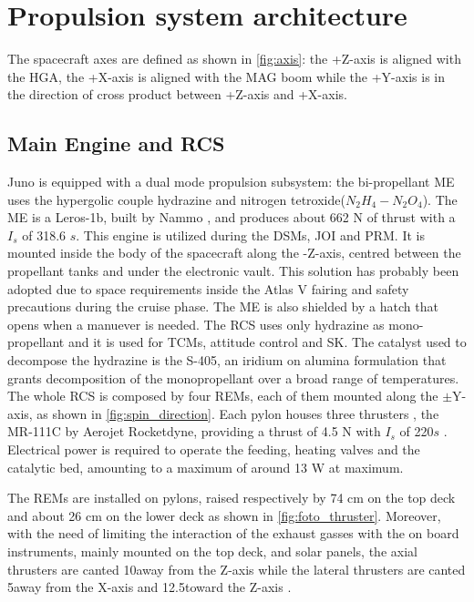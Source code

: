 \section{Propulsion system architecture}
\label{sec:prop_architecture}


The spacecraft axes are defined as shown in \autoref{fig:axis}: the +Z-axis is aligned with the HGA, the +X-axis is aligned with the MAG boom while the +Y-axis is in the direction of cross product between +Z-axis and +X-axis.


\subsection{Main Engine and RCS}
\label{sec:me and rcs}
Juno is equipped with a dual mode propulsion subsystem: the bi-propellant ME uses the hypergolic couple hydrazine and nitrogen tetroxide($N_2H_4 - N_2O_4$).
The ME is a Leros-1b, built by Nammo \cite{Leros}, and produces about 662 N of thrust with a $I_s$ of 318.6 $s$. This engine is utilized during the DSMs, JOI and PRM. It is mounted inside the body of the spacecraft along the -Z-axis, centred between the propellant tanks and under the electronic vault. This solution has probably been adopted due to space requirements inside the Atlas V fairing and safety precautions during the cruise phase. The ME is also shielded by a hatch that opens when a manuever is needed.
The RCS uses only hydrazine as mono-propellant and it is used for TCMs, attitude control and SK. The catalyst used to decompose the hydrazine is the S-405, an iridium on alumina formulation that grants decomposition of the monopropellant over a broad range of temperatures\cite{s405}. %
The whole RCS is composed by four REMs, each of them mounted along the $\pm$Y-axis, as shown in \autoref{fig:spin_direction}. Each pylon houses three thrusters , the MR-111C by Aerojet Rocketdyne\cite{RCS_info}, providing a thrust of 4.5 N with $I_s$ of 220$s$ . Electrical power is required to operate the feeding, heating valves and the catalytic bed, amounting to a maximum of around 13 W at maximum\cite{RCS_values}. 


The REMs are installed on pylons, raised respectively by 74 cm on the top deck and about 26 cm on the lower deck as shown in \autoref{fig:foto_thruster}. Moreover, with the need of limiting the interaction of the exhaust gasses with the on board instruments, mainly mounted on the top deck, and solar panels, the axial thrusters are canted 10\textdegree away from the Z-axis while the lateral thrusters are canted 5\textdegree away from the X-axis and 12.5\textdegree toward the Z-axis \cite{junno_inner}.
